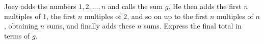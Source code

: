 Joey adds the numbers $1,2,\dots,n$ and calls the sum $g$. He then adds the first $n$ multiples of $1$, the first $n$ multiples of $2$, and so on up to the first $n$ multiples of $n$, obtaining $n$ sums, and finally adds these $n$ sums. Express the final total in terms of $g$.
